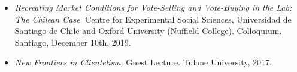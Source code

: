 \begin{itemize}
	\item[\textcolor{gray}{\textbullet}] \emph{Recreating Market Conditions for Vote-Selling and Vote-Buying in the Lab: The Chilean Case}. Centre for Experimental Social Sciences, Universidad de Santiago de Chile and Oxford University (Nuffield College). Colloquium. Santiago, December 10th, 2019.
	\item[\textcolor{gray}{\textbullet}] \emph{New Frontiers in Clientelism}. Guest Lecture. Tulane University, 2017.
\end{itemize}
